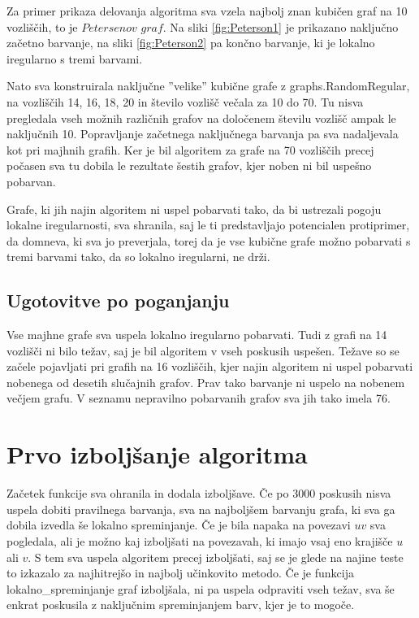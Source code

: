 \documentclass[12pt, a4paper]{article}
\begin{document}
Za primer prikaza delovanja algoritma sva vzela najbolj znan kubičen graf na 10 vozliščih, to je $Petersenov$ $graf$. Na sliki \ref{fig:Peterson1} je prikazano naključno začetno barvanje, na sliki \ref{fig:Peterson2} pa končno barvanje, ki je lokalno iregularno s tremi barvami.

Nato sva konstruirala naključne ”velike” kubične grafe z graphs.RandomRegular, na vozliščih 14, 16, 18, 20 in število vozlišč večala za 10 do 70. Tu nisva pregledala vseh možnih različnih grafov na določenem številu vozlišč ampak le naključnih 10. Popravljanje začetnega naključnega barvanja pa sva nadaljevala kot pri majhnih grafih. Ker je bil algoritem za grafe na 70 vozliščih precej počasen sva tu dobila le rezultate šestih grafov, kjer noben ni bil uspešno pobarvan.

Grafe, ki jih najin algoritem ni uspel pobarvati tako, da bi ustrezali pogoju lokalne iregularnosti, sva shranila, saj le ti predstavljajo potencialen protiprimer, da domneva, ki sva jo preverjala, torej da je vse kubične grafe možno pobarvati s tremi barvami tako, da so lokalno iregularni, ne drži.

\subsection{Ugotovitve po poganjanju}

Vse majhne grafe sva uspela lokalno iregularno pobarvati. Tudi z grafi na 14 vozlišči ni bilo težav, saj je bil algoritem v vseh poskusih uspešen. Težave so se začele pojavljati pri grafih na 16 vozliščih, kjer najin algoritem ni uspel pobarvati nobenega od desetih slučajnih grafov. Prav tako barvanje ni uspelo na nobenem večjem grafu. V seznamu nepravilno pobarvanih grafov sva jih tako imela 76.


\section{Prvo izboljšanje algoritma}

Začetek funkcije sva ohranila in dodala izboljšave. Če po 3000 poskusih nisva uspela dobiti pravilnega barvanja, sva na najboljšem barvanju grafa, ki sva ga dobila izvedla še lokalno spreminjanje. Če je bila napaka na povezavi $uv$ sva pogledala, ali je možno kaj izboljšati na povezavah, ki imajo vsaj eno krajišče $u$ ali $v$. S tem sva uspela algoritem precej izboljšati, saj se je glede na najine teste to izkazalo za najhitrejšo in najbolj učinkovito metodo. Če je funkcija lokalno_spreminjanje graf izboljšala, ni pa uspela odpraviti vseh težav, sva še enkrat poskusila z naključnim spreminjanjem barv, kjer je to mogoče.
\end{document}
